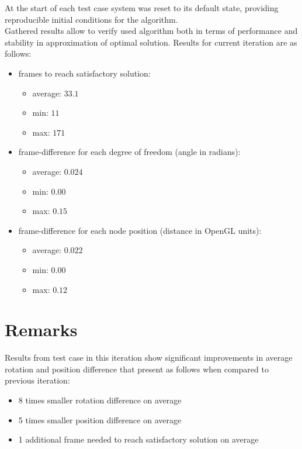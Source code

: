\documentclass[]{report}
\begin{document}
\noindent At the start of each test case system was reset to its default state, providing reproducible initial conditions for the algorithm.\\

\noindent Gathered results allow to verify used algorithm both in terms of performance and 
stability in approximation of optimal solution. Results for current iteration are as follows:

\begin{itemize}
	\item frames to reach satisfactory solution: 
	\begin{itemize}
		\item average: $33.1$ 
		\item min: $11$
		\item max: $171$
	\end{itemize}
	\item frame-difference for each degree of freedom (angle in radians): 
	\begin{itemize}
		\item average: $0.024$
		\item min: $0.00$
		\item max: $0.15$
	\end{itemize}
	\item frame-difference for each node position (distance in OpenGL units):
	\begin{itemize}
		\item  average: $0.022$ 
		\item min: $0.00$ 
		\item max: $0.12$
	\end{itemize}
\end{itemize}


\chapter*{Remarks}
\noindent Results from test case in this iteration show significant improvements in average rotation and position difference that present as follows when compared to previous iteration:
\begin{itemize}
	\item 8 times smaller rotation difference on average
	\item 5 times smaller position difference on average
	\item 1 additional frame needed to reach satisfactory solution on average
\end{itemize}
\end{document}
